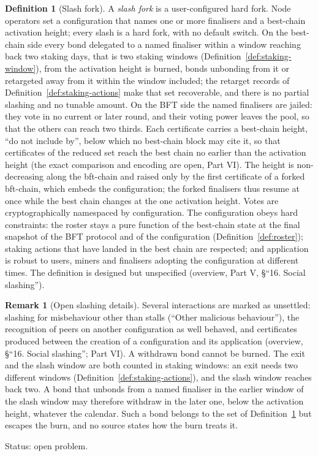 \documentclass[11pt,a4paper]{article}
\theoremstyle{definition}
\newtheorem{definition}[theorem]{Definition}
\newtheorem{remark}[theorem]{Remark}
\begin{document}
\begin{definition}[Slash fork]\label{def:slash-fork}
A \emph{slash fork} is a user-configured hard fork. Node operators set a
configuration that names one or more finalisers and a best-chain activation
height; every slash is a hard fork, with no default switch. On the
best-chain side every bond delegated to a named finaliser within a window
reaching back two staking days, that is two staking windows
(Definition~\ref{def:staking-window}), from the activation height is burned,
bonds unbonding from it or retargeted away from it within the window
included; the retarget records of Definition~\ref{def:staking-actions} make
that set recoverable, and there is no partial slashing and no tunable
amount. On the BFT side the named finalisers are jailed: they vote in no
current or later round, and their voting power leaves the pool, so that the
others can reach two thirds. Each certificate carries a best-chain height,
``do not include by'', below which no best-chain block may cite it, so that
certificates of the reduced set reach the best chain no earlier than the
activation height (the exact comparison and encoding are open, Part VI). The
height is non-decreasing along the bft-chain and raised only by the first
certificate of a forked bft-chain, which embeds the configuration; the
forked finalisers thus resume at once while the best chain changes at the
one activation height. Votes are cryptographically namespaced by configuration.
The configuration obeys hard constraints: the roster stays a pure function of
the best-chain state at the final snapshot of the BFT protocol and of the
configuration (Definition~\ref{def:roster}); staking actions that have landed in
the best chain are respected; and application is robust to users, miners and
finalisers adopting the configuration at different times. The definition is
designed but unspecified (overview, Part V, \S``16. Social slashing'').
\end{definition}

\begin{remark}[Open slashing details]\label{rem:slash-open}
Several interactions are marked as unsettled: slashing for misbehaviour other
than stalls (``Other malicious behaviour''), the recognition of peers on
another configuration as well behaved, and certificates produced between the
creation of a configuration and its application (overview, \S``16. Social
slashing''; Part VI). A withdrawn bond cannot be burned. The exit and the
slash window are both counted in staking windows: an exit needs two different
windows (Definition~\ref{def:staking-actions}), and the slash window reaches
back two. A bond that unbonds from a named finaliser in the earlier window of
the slash window may therefore withdraw in the later one, below the activation
height, whatever the calendar. Such a bond belongs to the set of
Definition~\ref{def:slash-fork} but escapes the burn, and no source states how
the burn treats it.

Status: open problem.
\end{remark}
\end{document}
